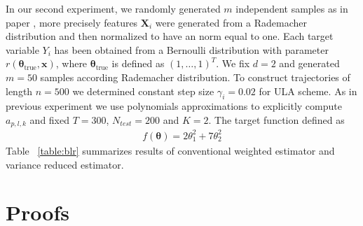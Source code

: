 \documentclass[article]{elsarticle}
\def\NtrainPath{T}
\begin{document}
In our second experiment, we randomly generated $m$ independent samples as in paper \cite{dalalyan2017theoretical}, more precisely features $\mathbf{X}_i$ were generated from a Rademacher distribution and then normalized to have an norm equal to one. Each target variable $Y_i$ has been obtained from a Bernoulli distribution with parameter $r (\mathbf{\theta}_{\text{true}},\mathbf{x})$, where $\mathbf{\theta}_{\text{true}}$ is defined as $(1, \dots, 1)^T$. We fix $d = 2$ and generated $m = 50$ samples according Rademacher distribution. To construct trajectories of length $n = 500 $ we determined constant step size $\gamma_i = 0.02$ for ULA scheme. As in previous experiment we use polynomials approximations to explicitly compute $a_{p,l,k}$ and fixed $\NtrainPath = 300$, $N_{test} = 200$ and $K=2$. The target function defined as
\begin{eqnarray*}
f(\mathbf{\theta}) = 2 \theta_1^2 + 7 \theta_2^2
\end{eqnarray*}
Table ~\ref{table:blr} summarizes results of conventional weighted estimator and variance reduced estimator.



\section{Proofs}
\end{document}
